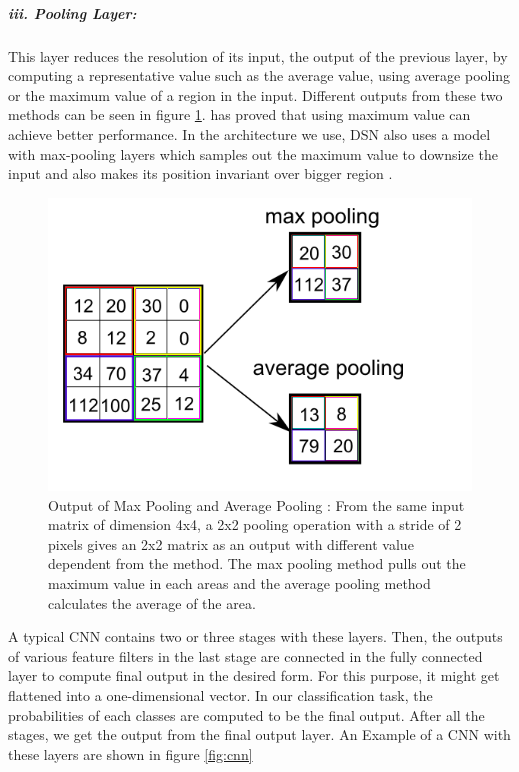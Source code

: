 \subparagraph*{iii. Pooling Layer:}This layer reduces the resolution of its input, the output of the previous layer, by computing a representative value such as the average value, using average pooling or the maximum value of a region in the input. Different outputs from these two methods can be seen in figure \ref{fig:pooling}. \cite{cnnpooling} has proved that using maximum value can achieve better performance. In the architecture we use, DSN also uses a model with max-pooling layers which samples out the maximum value to downsize the input and also makes its position invariant over bigger region \cite{flexHighCNN}.

\begin{figure}[tbh]
  \centering
    \includegraphics[width=0.6\linewidth]{abbildungen/pooling.png}
  \caption{Output of Max Pooling and Average Pooling \cite{fig:pooling}: From the same input matrix of dimension 4x4, a 2x2 pooling operation with a stride of 2 pixels gives an 2x2 matrix as an output with different value dependent from the method. The max pooling method pulls out the maximum value in each areas and the average pooling method calculates the average of the area. } 
  \label{fig:pooling} 
\end{figure}

A typical CNN contains two or three stages with these layers. Then, the outputs of various feature filters in the last stage are connected in the fully connected layer to compute final output in the desired form. For this purpose, it might get flattened into a one-dimensional vector. In our classification task, the probabilities of each classes are computed to be the final output. After all the stages, we get the output from the final output layer. An Example of a CNN with these layers are shown in figure \ref{fig:cnn}

